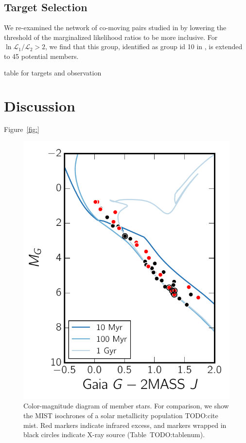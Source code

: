 \documentclass[letterpaper]{aastex6}
\newcommand{\todo}[1]{{\color{blue}TODO:#1}}
\begin{document}
\subsection{Target Selection}
\label{sub:target_selection}

We re-examined the network of co-moving pairs studied in \citealt{todo} by
lowering the threshold of the marginalized likelihood ratios to be more inclusive.
For $\ln{\mathcal{L}_1}/{\mathcal{L}_2}>2$, we find that this group,
identified as group id 10 in \citealt{todo}, is extended to 45 potential members.

table for targets and observation

\section{Discussion}
\label{sec:discussion}

Figure~\ref{fig:}

\begin{figure}[htpb]
  \centering
  \includegraphics[width=0.7\linewidth]{cmd_gjg.pdf}
  \caption{Color-magnitude diagram of member stars.
    For comparison, we show the MIST isochrones of a solar metallicity population \todo{cite mist}.
    Red markers indicate infrared excess,
    and markers wrapped in black circles indicate X-ray source (Table~\todo{tablenum}).
  }
  \label{fig:cmd_gjg}
\end{figure}
\end{document}
